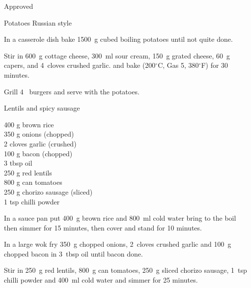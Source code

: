 \begin{menu}{Approved}
\begin{recipe}{2}{Potatoes Russian style}
\begin{ingredients}
		\end{ingredients}
	
	
    \begin{instructions}
    \item 
        In a casserole dish bake
        1500~g cubed boiling potatoes
        until not quite done.
      \item 
        Stir in
        600~g  cottage cheese,
        300~ml  sour cream,
        150~g grated cheese,
        60~g  capers,
        and
        4~cloves crushed garlic.
        and bake 
      (200$^{\circ}$C, Gas 5, 380$^{\circ}$F)
     for 30 minutes.
      \item 
        Grill 4~  burgers and serve with the potatoes.
      
    \end{instructions}
    \end{recipe}%
  
    \begin{recipe}{2}{Lentils and spicy sausage}%
    
		\begin{ingredients}
		400 g brown rice  \\
	350 g onions (chopped) \\
	2 cloves garlic (crushed) \\
	100 g bacon (chopped) \\
	3 tbsp oil  \\
	250 g red lentils  \\
	800 g can tomatoes  \\
	250 g chorizo sausage (sliced) \\
	1 tsp chilli powder  \\
	
		\end{ingredients}
	
    \begin{instructions}
    \item 
      In a
      sauce pan
      put
      400~g  brown rice
      and
      800~ml  cold water
      bring to the boil then simmer for 15 minutes,
      then cover and stand for 10 minutes.
    \item 
        In a large wok fry
        350~g chopped onions,
        2~cloves crushed garlic
        and
        100~g chopped bacon
        in
        3~tbsp  oil
        until bacon done.
      \item 
        Stir in
        250~g  red lentils,
        800~g  can tomatoes,
        250~g sliced chorizo sausage,
        1~tsp  chilli powder
        and
        400~ml  cold water
        and simmer for 25 minutes.
      

\end{instructions}
\end{recipe}
\end{menu}
